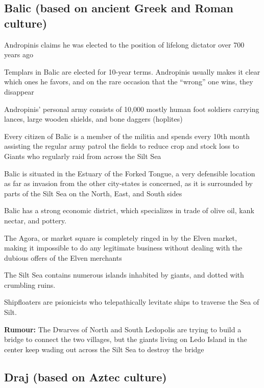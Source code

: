 \begin{multicols}{2}

\subsection{Balic (based on ancient Greek and Roman culture)}

\begin{description}
    \item Andropinis claims he was elected to the position of lifelong dictator over 700 years ago
    \item Templars in Balic are elected for 10-year terms. Andropinis usually makes it clear which ones he favors, and on the rare occasion that the “wrong” one wins, they disappear
    \item Andropinis’ personal army consists of 10,000 mostly human foot soldiers carrying lances, large wooden shields, and bone daggers (hoplites)
    \item Every citizen of Balic is a member of the militia and spends every 10th month assisting the regular army patrol the fields to reduce crop and stock loss to Giants who regularly raid from across the Silt Sea
    \item Balic is situated in the Estuary of the Forked Tongue, a very defensible location as far as invasion from the other city-states is concerned, as it is surrounded by parts of the Silt Sea on the North, East, and South sides
    \item Balic has a strong economic district, which specializes in trade of olive oil, kank nectar, and pottery.
    \item The Agora, or market square is completely ringed in by the Elven market, making it impossible to do any legitimate business without dealing with the dubious offers of the Elven merchants
    \item The Silt Sea contains numerous islands inhabited by giants, and dotted with crumbling ruins.
    \item Shipfloaters are psionicists who telepathically levitate ships to traverse the Sea of Silt.
    \item \textbf{Rumour:} The Dwarves of North and South Ledopolis are trying to build a bridge to connect the two villages, but the giants living on Ledo Island in the center keep wading out across the Silt Sea to destroy the bridge
\end{description}

\subsection{Draj (based on Aztec culture)}


\end{multicols}
